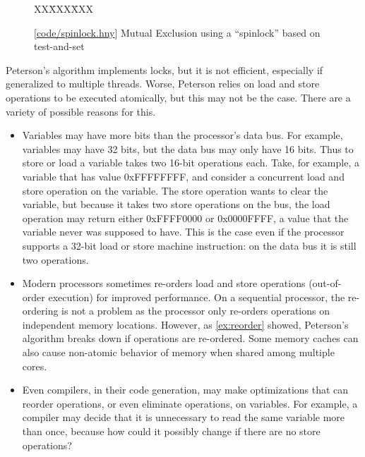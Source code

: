 \documentclass{report}
\newcommand{\harmonysource}[1]{
\begin{tabbing}
XX\=XXX\=XXX\kill
    
\end{tabbing}
}
\newcommand{\harmonylink}[1]{%
[\href{https://harmony.cs.cornell.edu/#1}{\underline{#1}}]%
}
\newenvironment{code}{
\tcolorbox
}{
\endtcolorbox
}
\begin{document}
%

\begin{figure}
\begin{code}
\harmonysource{spinlock}
\end{code}
\caption{\harmonylink{code/spinlock.hny} Mutual Exclusion using a ``spinlock'' based on test-and-set}
\label{fig:tas}
\end{figure}

Peterson's algorithm implements locks, but it is not efficient,
especially if generalized to multiple threads.
Worse, Peterson relies on load and store operations to be executed
atomically, but this may not be the case.
There are a variety of possible reasons for this.

\begin{itemize}
\item Variables may have more bits than the processor's data bus.
For example, variables may have 32 bits, but the data bus may only
have 16 bits.  Thus to store or load a variable takes two 16-bit
operations each.  Take, for example, a variable that has value
0xFFFFFFFF, and consider a concurrent load and store operation on
the variable.
The store operation wants to clear the variable, but because it
takes two store operations on the bus, the load operation may
return either 0xFFFF0000 or 0x0000FFFF, a value that the variable
never was supposed to have.
This is the case even if the processor supports a 32-bit load or
store machine instruction: on the data bus it is still two
operations.
\item Modern processors sometimes re-orders load and store operations
(out-of-order execution) for improved performance.  On a sequential processor,
the re-ordering is not a problem as the processor only re-orders
operations on independent memory locations.  However, as \autoref{ex:reorder}
showed, Peterson's algorithm breaks down if operations are re-ordered.
Some memory caches can also cause non-atomic behavior of memory when shared
among multiple cores.
\item Even compilers, in their code generation, may make optimizations
that can reorder operations, or even eliminate operations, on variables.
For example, a compiler may decide that it is unnecessary to read the same
variable more than once, because how could it possibly change if there
are no store operations?
\end{itemize}
\end{document}
